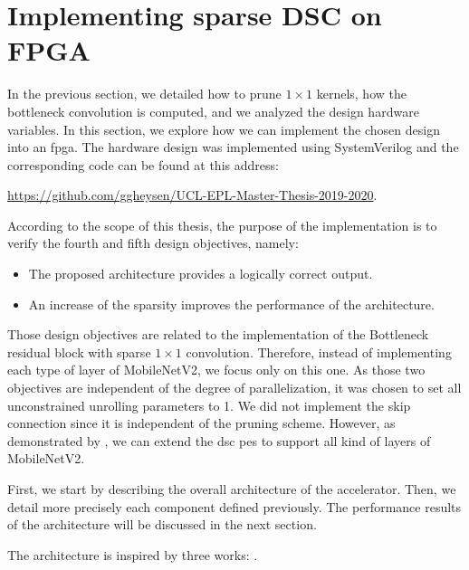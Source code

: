\section{Implementing sparse DSC on FPGA} \label{sec:implementation}
In the previous section, we detailed how to prune $1 \times 1$ kernels, how the bottleneck convolution is computed, and we analyzed the design hardware variables. In this section, we explore how we can implement the chosen design into an \acrshort{fpga}. The hardware design was implemented using SystemVerilog and the corresponding code can be found at this address: 
%
\begin{center}
    \url{https://github.com/ggheysen/UCL-EPL-Master-Thesis-2019-2020}.
\end{center}
%
According to the scope of this thesis, the purpose of the implementation is to verify the fourth and fifth design objectives, namely:
%
\begin{itemize}
    \item The proposed architecture provides a logically correct output.
    \item An increase of the sparsity improves the performance of the architecture.
\end{itemize}
%
Those design objectives are related to the implementation of the Bottleneck residual block with sparse $1 \times 1$ convolution. Therefore, instead of implementing each type of layer of MobileNetV2, we focus only on this one. As those two objectives are independent of the degree of parallelization, it was chosen to set all unconstrained unrolling parameters to 1. We did not implement the skip connection since it is independent of the pruning scheme. However, as demonstrated by \textcite{bai_cnn_2018, liu_fpga-based_2019}, we can extend the \acrshort{dsc} \acrshort{pe}s to support all kind of layers of MobileNetV2. 

First, we start by describing the overall architecture of the accelerator. Then, we detail more precisely each component defined previously. The performance results of the architecture will be discussed in the next section.

The architecture is inspired by three works: \textcite{zhu_efficient_2020, bai_cnn_2018, kang_accelerator-aware_2020,}.
%
